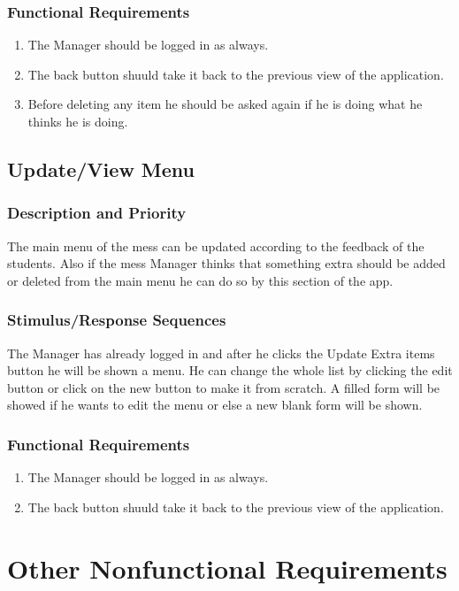 \documentclass{scrreprt}
\begin{document}
\subsection{Functional Requirements}
\begin{enumerate}
    \item The Manager should be logged in as always.
    \item The back button shuuld take it back to the previous view of the application.
    \item Before deleting any item he should be asked again if he is doing what he thinks he is doing.
\end{enumerate}


\section{Update/View Menu}

\subsection{Description and Priority}
The main menu of the mess can be updated according to the feedback of the students. Also if the mess Manager thinks that something extra should be added or deleted from the main menu he can do so by this section of the app.

\subsection{Stimulus/Response Sequences}
The Manager has already logged in and after he clicks the Update Extra items button he will be shown a menu. He can change the whole list by clicking the edit button or click on the new button to make it from scratch. A filled form will be showed if he wants to edit the menu or else a new blank form will be shown.

\subsection{Functional Requirements}
\begin{enumerate}
    \item The Manager should be logged in as always.
    \item The back button shuuld take it back to the previous view of the application.
\end{enumerate}



\chapter{Other Nonfunctional Requirements}
\end{document}
